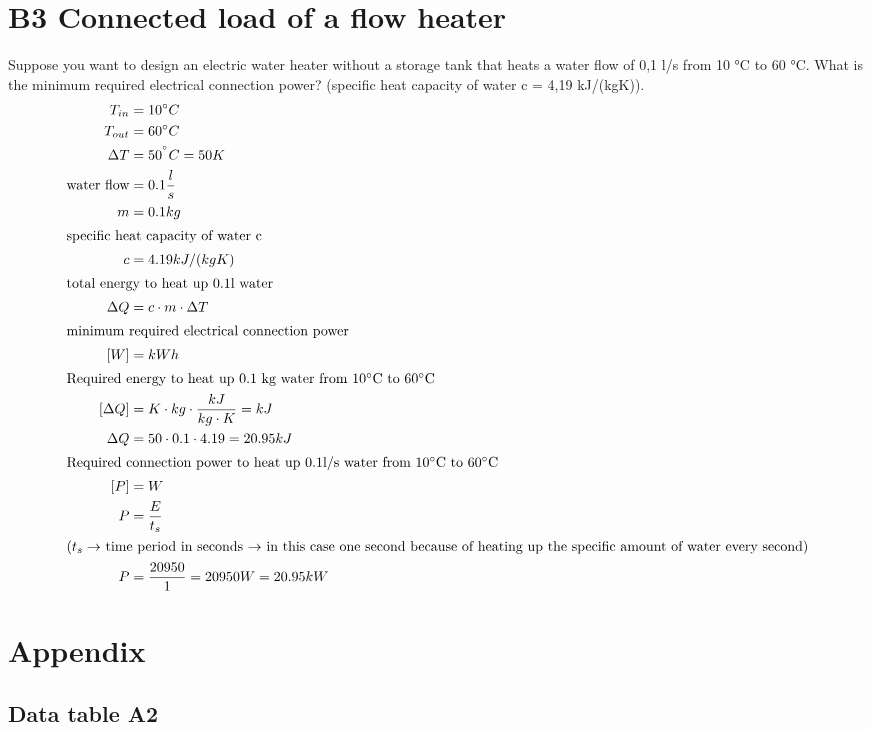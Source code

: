\documentclass[10pt,ngerman]{scrartcl}
\begin{document}
\section{B3 Connected load of a flow heater}
Suppose you want to design an electric water heater without a storage tank that heats a water flow of 0,1 l/s from 10 °C to 60 °C. 
What is the minimum required electrical connection power? (specific heat capacity of water c = 4,19 kJ/(kgK)).
\newline
\begin{align*}
	T_{in} &= 10\degree C \\
	T_{out} &= 60\degree C \\
	\Delta T &= 50^{\degree}C = 50K \\
	\text{water flow} &= 0.1\frac{l}{s} \\
	m &= 0.1kg \\
	\intertext{specific heat capacity of water c} 
	c &= 4.19kJ/(kgK) \\
	\intertext{total energy to heat up 0.1l water}
	\Delta Q &= c \cdot m \cdot \Delta T \\
	\intertext{minimum required electrical connection power} 
	[W] &= kWh \\
	\intertext{Required energy to heat up 0.1 kg water from $10\degree$C to $60\degree$C}
	\left[\Delta Q\right] &= K \cdot kg \cdot \frac{kJ}{kg \cdot K} = kJ \\
	\Delta Q &= 50 \cdot 0.1 \cdot 4.19 = 20.95kJ \\
	\intertext{Required connection power to heat up 0.1l/s water from $10\degree$C to $60\degree$C}
	\left[P\right] &= W \\
	P &= \frac{E}{t_{s}} \\
	\intertext{($t_{s}\rightarrow$ time period in seconds $\rightarrow$ in this case one second because of heating up the specific amount of water every second)}
	P &= \frac{20950}{1} = 20950W = 20.95kW
\end{align*}

\newpage
\section{Appendix}
\subsection{Data table A2}
\label{sec:data-table-a2}

\end{document}
